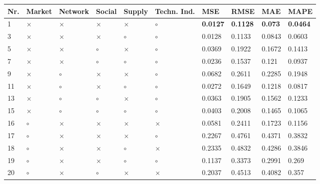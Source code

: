 \begin{table}[H]
\centering
\begin{tabular}{|P{0.7cm}|P{1.3cm}P{1.3cm}P{1.3cm}P{1.3cm}P{1.3cm}|P{1.1cm}P{1.1cm}P{1.1cm}P{1.1cm}|}
\hline
 Nr. &   Market &  Network &   Social &   Supply & Techn. Ind. &             MSE &            RMSE &            MAE &            MAPE \\
 & $\times$ & $\times$ & $\times$ & $\times$ &     $\circ$ & \textbf{0.0127} & \textbf{0.1128} & \textbf{0.073} & \textbf{0.0464} \\
   3 & $\times$ & $\times$ & $\times$ &  $\circ$ &     $\circ$ &          0.0128 &          0.1133 &         0.0843 &          0.0603 \\
   5 & $\times$ & $\times$ &  $\circ$ & $\times$ &     $\circ$ &          0.0369 &          0.1922 &         0.1672 &          0.1413 \\
   7 & $\times$ & $\times$ &  $\circ$ &  $\circ$ &     $\circ$ &          0.0236 &          0.1537 &          0.121 &          0.0937 \\
   9 & $\times$ &  $\circ$ & $\times$ & $\times$ &     $\circ$ &          0.0682 &          0.2611 &         0.2285 &          0.1948 \\
  11 & $\times$ &  $\circ$ & $\times$ &  $\circ$ &     $\circ$ &          0.0272 &          0.1649 &         0.1218 &          0.0817 \\
  13 & $\times$ &  $\circ$ &  $\circ$ & $\times$ &     $\circ$ &          0.0363 &          0.1905 &         0.1562 &          0.1233 \\
  15 & $\times$ &  $\circ$ &  $\circ$ &  $\circ$ &     $\circ$ &          0.0403 &          0.2008 &         0.1465 &          0.1065 \\
  16 &  $\circ$ & $\times$ & $\times$ & $\times$ &    $\times$ &          0.0581 &          0.2411 &         0.1723 &          0.1156 \\
  17 &  $\circ$ & $\times$ & $\times$ & $\times$ &     $\circ$ &          0.2267 &          0.4761 &         0.4371 &          0.3832 \\
  18 &  $\circ$ & $\times$ & $\times$ &  $\circ$ &    $\times$ &          0.2335 &          0.4832 &         0.4286 &          0.3846 \\
  19 &  $\circ$ & $\times$ & $\times$ &  $\circ$ &     $\circ$ &          0.1137 &          0.3373 &         0.2991 &           0.269 \\
  20 &  $\circ$ & $\times$ &  $\circ$ & $\times$ &    $\times$ &          0.2037 &          0.4513 &         0.4082 &           0.357 \\

\end{tabular}
\end{table}
